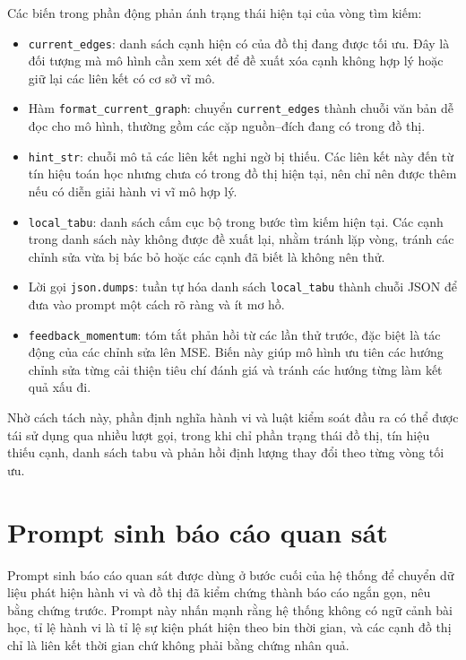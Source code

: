 Các biến trong phần động phản ánh trạng thái hiện tại của vòng tìm kiếm:
\begin{itemize}
\item \texttt{current\_edges}: danh sách cạnh hiện có của đồ thị đang được tối ưu. Đây là đối tượng mà mô hình cần xem xét để đề xuất xóa cạnh không hợp lý hoặc giữ lại các liên kết có cơ sở vĩ mô.
\item Hàm \texttt{format\_current\_graph}: chuyển \texttt{current\_edges} thành chuỗi văn bản dễ đọc cho mô hình, thường gồm các cặp nguồn--đích đang có trong đồ thị.
\item \texttt{hint\_str}: chuỗi mô tả các liên kết nghi ngờ bị thiếu. Các liên kết này đến từ tín hiệu toán học nhưng chưa có trong đồ thị hiện tại, nên chỉ nên được thêm nếu có diễn giải hành vi vĩ mô hợp lý.
\item \texttt{local\_tabu}: danh sách cấm cục bộ trong bước tìm kiếm hiện tại. Các cạnh trong danh sách này không được đề xuất lại, nhằm tránh lặp vòng, tránh các chỉnh sửa vừa bị bác bỏ hoặc các cạnh đã biết là không nên thử.
\item Lời gọi \texttt{json.dumps}: tuần tự hóa danh sách \texttt{local\_tabu} thành chuỗi JSON để đưa vào prompt một cách rõ ràng và ít mơ hồ.
\item \texttt{feedback\_momentum}: tóm tắt phản hồi từ các lần thử trước, đặc biệt là tác động của các chỉnh sửa lên MSE. Biến này giúp mô hình ưu tiên các hướng chỉnh sửa từng cải thiện tiêu chí đánh giá và tránh các hướng từng làm kết quả xấu đi.
\end{itemize}

Nhờ cách tách này, phần định nghĩa hành vi và luật kiểm soát đầu ra có thể được tái sử dụng qua nhiều lượt gọi, trong khi chỉ phần trạng thái đồ thị, tín hiệu thiếu cạnh, danh sách tabu và phản hồi định lượng thay đổi theo từng vòng tối ưu.

\section{Prompt sinh báo cáo quan sát}

Prompt sinh báo cáo quan sát được dùng ở bước cuối của hệ thống để chuyển dữ liệu phát hiện hành vi và đồ thị đã kiểm chứng thành báo cáo ngắn gọn, nêu bằng chứng trước. Prompt này nhấn mạnh rằng hệ thống không có ngữ cảnh bài học, tỉ lệ hành vi là tỉ lệ sự kiện phát hiện theo bin thời gian, và các cạnh đồ thị chỉ là liên kết thời gian chứ không phải bằng chứng nhân quả.

